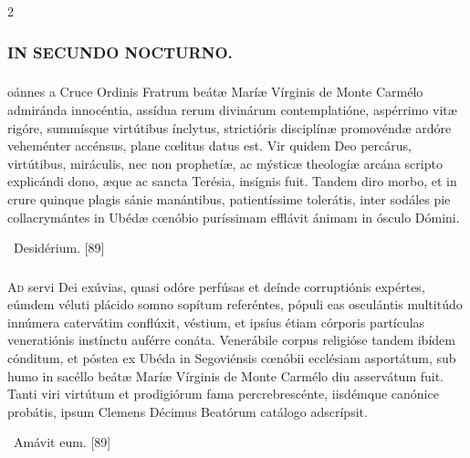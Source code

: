 \documentclass[9pt,twoside]{extarticle}
\begin{document}
\begin{multicols}{2}
\subsubsection*{\center \textsc{IN SECUNDO NOCTURNO.}}
\subsubsection*{\center {}}
oánnes a Cruce Ordinis Fratrum beátæ Maríæ Vírginis de Monte Carmélo admiránda innocéntia, assídua rerum divinárum contemplatióne, aspérrimo vitæ rigóre, summísque virtútibus ínclytus, strictióris disciplínæ promovéndæ ardóre veheménter accénsus, plane cœlitus datus est. Vir quidem Deo percárus, virtútibus, miráculis, nec non prophetíæ, ac mýsticæ theologíæ arcána scripto explicándi dono, æque ac sancta Terésia, insígnis fuit. Tandem diro morbo, et in crure quinque plagis sánie manántibus, patientíssime tolerátis, inter sodáles pie collacrymántes in Ubédæ cœnóbio puríssimam efflávit ánimam in ósculo Dómini.

\begin{tightlist}{}
\item {}~Desidérium. [89]
\end{tightlist}

\subsubsection*{\center {}}
\lettrine{A}d servi Dei exúvias, quasi odóre perfúsas et deínde corruptiónis expértes, eúmdem véluti plácido somno sopítum referéntes, pópuli eas osculántis multitúdo innúmera catervátim conflúxit, véstium, et ipsíus étiam córporis partículas veneratiónis instínctu auférre conáta. Venerábile corpus religióse tandem ibídem cónditum, et póstea ex Ubéda in Segoviénsis cœnóbii ecclésiam asportátum, sub humo in sacéllo beátæ Maríæ Vírginis de Monte Carmélo diu asservátum fuit. Tanti viri virtútum et prodigiórum fama percrebrescénte, iisdémque canónice probátis, ipsum Clemens Décimus Beatórum catálogo adscrípsit.

\begin{tightlist}{}
\item {}~Amávit eum. [89]
\end{tightlist}


\end{multicols}
\end{document}
